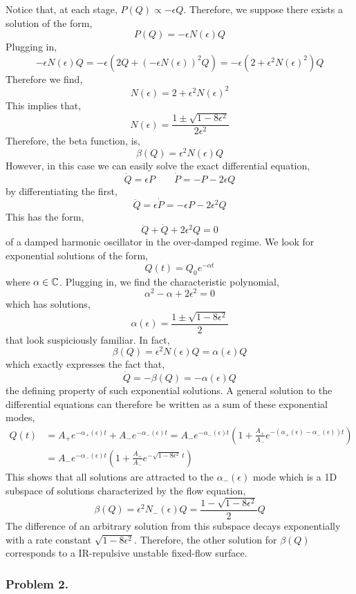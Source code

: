 \documentclass[12pt]{article}
\begin{document}
Notice that, at each stage, $P(Q) \propto -\epsilon Q$. Therefore, we suppose there exists a solution of the form,
\[ P(Q) = - \epsilon N(\epsilon) Q \]
Plugging in,
\[ -\epsilon N(\epsilon) Q = -\epsilon (2 Q + (-\epsilon N(\epsilon))^2 Q) = - \epsilon(2 + \epsilon^2 N(\epsilon)^2) Q \]
Therefore we find,
\[ N(\epsilon) = 2 + \epsilon^2 N(\epsilon)^2 \]
This implies that,
\[ N(\epsilon) = \frac{1 \pm \sqrt{1 - 8 \epsilon^2}}{2 \epsilon^2} \]
Therefore, the beta function, is,
\[ \beta(Q) = \epsilon^2 N(\epsilon) Q \] 
However, in this case we can easily solve the exact differential equation,
\[ \dot{Q} = \epsilon P \quad \quad \dot{P} = - P - 2 \epsilon Q \]
by differentiating the first,
\[ \ddot{Q} = \epsilon \dot{P} = - \epsilon P - 2 \epsilon^2 Q \]
This has the form,
\[ \ddot{Q} + \dot{Q} + 2 \epsilon^2 Q = 0 \]
of a damped harmonic oscillator in the over-damped regime. We look for exponential solutions of the form,
\[ Q(t) = Q_0 e^{-\alpha t} \]
where $\alpha \in \mathbb{C}$. Plugging in, we find the characteristic polynomial,
\[ \alpha^2 - \alpha + 2 \epsilon^2 = 0 \]
which has solutions,
\[ \alpha(\epsilon) = \frac{1 \pm \sqrt{1 - 8 \epsilon^2}}{2} \]
that look suspiciously familiar. In fact, 
\[ \beta(Q) = \epsilon^2 N(\epsilon) Q = \alpha(\epsilon) Q \]
which exactly expresses the fact that,
\[ \dot{Q} = - \beta(Q) = - \alpha(\epsilon) Q \]
the defining property of such exponential solutions. A general solution to the differential equations can therefore be written as a sum of these exponential modes,
\begin{align*}
Q(t) & = A_{+} e^{-\alpha_{+}(\epsilon) t} + A_{-} e^{-\alpha_{-}(\epsilon) t} = A_{-} e^{- \alpha_{-}(\epsilon) t} \left( 1 + \frac{A_{+}}{A_{-}} e^{- (\alpha_{+}(\epsilon) - \alpha_{-}(\epsilon)) t} \right)
\\
& = A_{-} e^{- \alpha_{-}(\epsilon) t} \left( 1 + \frac{A_{+}}{A_{-}} e^{- \sqrt{1 - 8 \epsilon^2} \: t} \right)
\end{align*}
This shows that all solutions are attracted to the $\alpha_{-}(\epsilon)$ mode which is a 1D subspace of solutions characterized by the flow equation,
\[ \beta(Q) = \epsilon^2 N_{-}(\epsilon) Q = \frac{1 - \sqrt{1 - 8 \epsilon^2}}{2} Q \]
The difference of an arbitrary solution from this subspace decays exponentially with a rate constant $\sqrt{1 - 8 \epsilon^2}$. Therefore, the other solution for $\beta(Q)$ corresponds to a IR-repulsive unstable fixed-flow surface. 

\subsubsection{Problem 2.}
\end{document}
